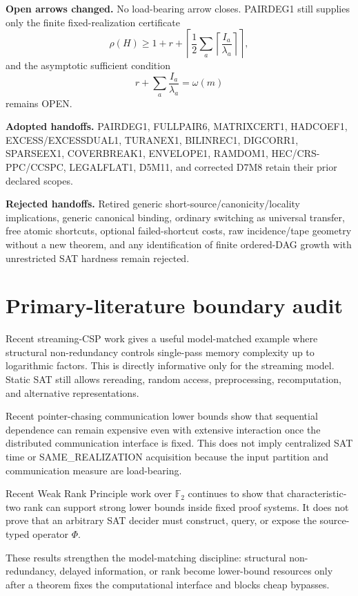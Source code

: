 \documentclass[11pt]{article}
\begin{document}
\textbf{Open arrows changed.}
No load-bearing arrow closes. PAIRDEG1 still supplies only the finite fixed-realization certificate
\[
\rho(H)\ge
1+r+
\left\lceil\frac12\sum_a
\left\lceil\frac{I_a}{\lambda_a}\right\rceil
\right\rceil,
\]
and the asymptotic sufficient condition
\[
r+\sum_a\frac{I_a}{\lambda_a}=\omega(m)
\]
remains OPEN.

\textbf{Adopted handoffs.}
PAIRDEG1, FULLPAIR6, MATRIXCERT1, HADCOEF1, EXCESS/EXCESSDUAL1, TURANEX1, BILINREC1, DIGCORR1, SPARSEEX1, COVERBREAK1, ENVELOPE1, RAMDOM1, HEC/CRS-PPC/CCSPC, LEGALFLAT1, D5M11, and corrected D7M8 retain their prior declared scopes.

\textbf{Rejected handoffs.}
Retired generic short-source/canonicity/locality implications, generic canonical binding, ordinary switching as universal transfer, free atomic shortcuts, optional failed-shortcut costs, raw incidence/tape geometry without a new theorem, and any identification of finite ordered-DAG growth with unrestricted SAT hardness remain rejected.

\section*{Primary-literature boundary audit}
Recent streaming-CSP work gives a useful model-matched example where structural non-redundancy controls single-pass memory complexity up to logarithmic factors. This is directly informative only for the streaming model. Static SAT still allows rereading, random access, preprocessing, recomputation, and alternative representations.

Recent pointer-chasing communication lower bounds show that sequential dependence can remain expensive even with extensive interaction once the distributed communication interface is fixed. This does not imply centralized SAT time or SAME\_REALIZATION acquisition because the input partition and communication measure are load-bearing.

Recent Weak Rank Principle work over \(\mathbb F_2\) continues to show that characteristic-two rank can support strong lower bounds inside fixed proof systems. It does not prove that an arbitrary SAT decider must construct, query, or expose the source-typed operator \(\Phi\).

These results strengthen the model-matching discipline: structural non-redundancy, delayed information, or rank become lower-bound resources only after a theorem fixes the computational interface and blocks cheap bypasses.
\end{document}
